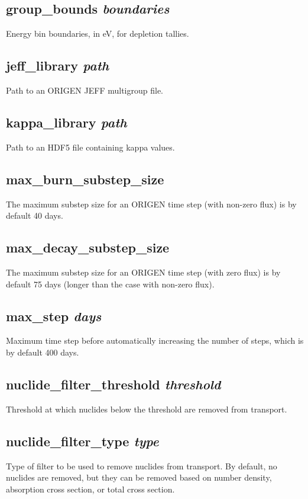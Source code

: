 \documentclass[10pt]{article}
\begin{document}
\subsection{group\_bounds \textit{boundaries}}
Energy bin boundaries, in eV, for depletion tallies.

\subsection{jeff\_library \textit{path}}
Path to an ORIGEN JEFF multigroup file. 

\subsection{kappa\_library \textit{path}}
Path to an HDF5 file containing kappa values. 

\subsection{max\_burn\_substep\_size}
The maximum substep size for an ORIGEN time step (with non-zero flux) is by default 40 days. 

\subsection{max\_decay\_substep\_size}
The maximum substep size for an ORIGEN time step (with zero flux) is by default 75 days (longer than the case with non-zero flux).

\subsection{max\_step \textit{days}}
Maximum time step before automatically increasing the number of steps, which is by default 400 days.

\subsection{nuclide\_filter\_threshold \textit{threshold}}
Threshold at which nuclides below the threshold are removed from transport. 

\subsection{nuclide\_filter\_type \textit{type}}
Type of filter to be used to remove nuclides from transport. By default, no nuclides are removed, but they can be removed based on number density, absorption cross section, or total cross section.
\end{document}
